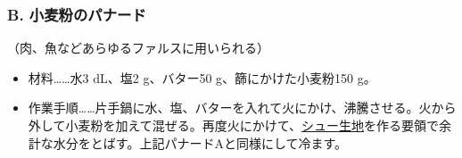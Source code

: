 \begin{recette}
\hypertarget{panade-b}{%
\subsubsection{B. 小麦粉のパナード}\label{panade-b}}



（肉、魚などあらゆるファルスに用いられる）

\begin{itemize}
\item
  材料\ldots{}\ldots{}水3 dL、塩2 g、バター50 g、篩にかけた小麦粉150 g。
\item
  作業手順\ldots{}\ldots{}片手鍋に水、塩、バターを入れて火にかけ、沸騰させる。火から外して小麦粉を加えて混ぜる。再度火にかけて、\protect\hyperlink{pate-a-chou}{シュー生地}を作る要領で余計な水分をとばす。上記パナードAと同様にして冷ます。
\end{itemize}

\hypertarget{panade-c}{%
}
\end{recette}
